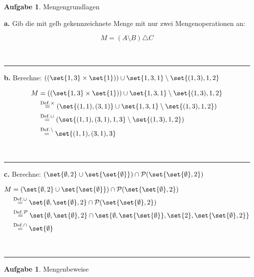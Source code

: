 \documentclass[10pt,leqno ]{article}
\DeclarePairedDelimiter\set\{\}
\newcommand\customeq[1]{\overset{\mathrm{#1}}{=}}
\theoremstyle{definition}
\newtheorem{problem}[theorem]{Aufgabe}
\newenvironment{solution}[1][L]{\begin{doublespace}\textbf{#1.}\quad }{\ \rule{0.5em}{0.5em}\end{doublespace}}
\begin{document}
\begin{problem}
Mengengrundlagen
\end{problem}

\begin{solution}[a]
Gib die mit gelb gekennzeichnete Menge mit nur zwei Mengenoperationen an:

\[ M = (A \setminus B) \triangle C \]

\end{solution}

\begin{solution}[b]
Berechne: \( (( \set{1,3} \times \set{1} )) \cup \set{1, 3, 1 } \setminus \set{(1,3), 1,2} \)

\begin{align*}
    M &= (( \set{1,3} \times \set{1} )) \cup \set{1, 3, 1 } \setminus \set{(1,3), 1,2} \\
    & \customeq{Def. \times} (\set{(1,1), (3,1)} \cup \set{1,3,1} \setminus \set{(1,3),1,2}) \\
    & \customeq{Def. \cup} (\set{(1,1),(3,1),1,3} \setminus \set{(1,3),1,2}) \\
    & \customeq{Def. \setminus} \set{(1,1),(3,1),3}
\end{align*}

\end{solution}

\begin{solution}[c]
Berechne: \( ( \set{\emptyset,2} \cup \set{\set{\emptyset}}) \cap \mathcal{P} (\set{ \set{\emptyset}, 2}) \)

\begin{align*}
    M &= ( \set{\emptyset,2} \cup \set{\set{\emptyset}}) \cap \mathcal{P} (\set{ \set{\emptyset}, 2}) \\
    & \customeq{Def. \cup} \set{\emptyset, \set{\emptyset}, 2} \cap \mathcal{P} (\set{ \set{\emptyset}, 2}) \\
    & \customeq{Def. \mathcal{P}} \set{\emptyset, \set{\emptyset}, 2} \cap \set{\emptyset, \set{\set{\emptyset}}, \set{2}, \set{\set{\emptyset}, 2}} \\
    & \customeq{Def. \cap} \set{\emptyset}
\end{align*}

\end{solution}

\begin{problem}
Mengenbeweise
\end{problem}
\end{document}
